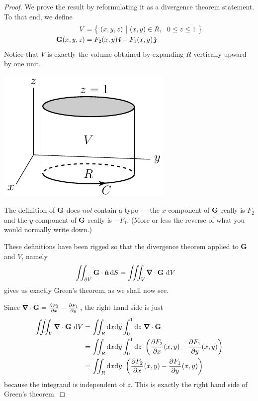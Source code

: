 \begin{proof}
We prove the result by reformulating it as a divergence theorem statement.
To that end, we define
\begin{align*}
V&=\big\{ \ (x,y,z)\ \big|\  (x,y)\in R,\ \ 0\le z\le 1\ \big\} \\
\mathbf{G}(x,y,z) &= F_2(x,y)\,\hat{\pmb{\imath}} -F_1(x,y)\,\hat{\pmb{\jmath}}
\end{align*}
Notice that $V$ is exactly the volume obtained by expanding $R$ vertically
upward by one unit.
 
\begin{nfig}
\begin{center}
    \includegraphics{greens2.pdf}
\end{center}
\end{nfig}
The definition of $\mathbf{G}$ does \emph{not} contain a typo --- the $x$-component
of $\mathbf{G}$ really is $F_2$ and the $y$-component of $\mathbf{G}$ really is $-F_1$.
(More or less the reverse of what you would normally write down.)

These definitions have been rigged so that the divergence theorem
applied to $\mathbf{G}$ and $V$, namely
\begin{align*}
\dblInt_{\partial V} \vG\cdot\hn\,\dee{S}
&=\tripInt_V\vnabla\cdot\vG\ \dee{V} 
\end{align*}
gives us exactly Green's theorem, as we shall now see.

Since $\vnabla\cdot\vG = \frac{\partial F_2}{\partial x} 
                - \frac{\partial F_1}{\partial y}$,  the right hand side is just
\begin{align*}
\tripInt_V\vnabla\cdot\vG\ \dee{V}
&= \dblInt_{R}\dee{x}\dee{y}\int_0^1\dee{z} \ \vnabla\cdot\vG \\
&= \dblInt_{R}\dee{x}\dee{y}\int_0^1\dee{z} \ 
        \left(\frac{\partial F_2}{\partial x}(x,y) 
                - \frac{\partial F_1}{\partial y}(x,y)\right) \\
&= \dblInt_{R}\dee{x}\dee{y}\
        \left(\frac{\partial F_2}{\partial x}(x,y) 
                - \frac{\partial F_1}{\partial y}(x,y)\right) 
\end{align*}
because the integrand is independent of $z$. This is exactly the right 
hand side of Green's theorem.


\end{proof}
